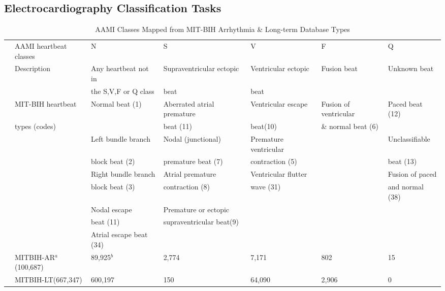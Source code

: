 \documentclass[journal]{IEEEtran}
\begin{document}
\subsection{Electrocardiography Classification Tasks}

\begin{table}[]
\begin{center}
\begin{threeparttable}
\caption{AAMI Classes Mapped from MIT-BIH Arrhythmia \& Long-term Database Types}
\label{Table1}
\begin{tabular}{cllllll}
\hline
& AAMI heartbeat classes & N & S & V & F & Q \\
& Description  &Any heartbeat not in & Supraventricular ectopic  & Ventricular ectopic  & Fusion beat & Unknown beat \\
&                     &the S,V,F or Q class & beat   		     & beat	      &	     &          \\
\hline
& MIT-BIH heartbeat  &Normal beat (1)            & Aberrated atrial premature & Ventricular escape & Fusion of ventricular& Paced beat (12)\\
&  types (codes)   &  					  &  beat (11)		    &  beat(10)	            & \& normal beat (6)		      &             \\

&                     &Left bundle branch   &  Nodal (junctional) &Premature ventricular& 	 &  Unclassifiable \\
&                     &block beat (2)            & premature beat (7)    &contraction (5)         &	   & beat (13)   \\

&                     & Right bundle branch & Atrial premature & Ventricular flutter &    &  Fusion of paced  \\
&                     & block beat (3) & contraction (8)     & wave (31) & 	   & and normal (38)  \\

&                     & Nodal escape  & Premature or ectopic & 	     &  &                          \\
&                     & beat (11)	  & supraventricular beat(9) &     &   &     \\

&                     & Atrial escape beat (34)   &  	  				      & 				            & 			      &                          \\
\hline
& MITBIH-AR$^a$(100,687) & 89,925$^b$   & 2,774   & 7,171   & 802    & 15        \\
& MITBIH-LT(667,347) & 600,197  &  150  & 64,090  & 	2,906   & 0       \\


\end{tabular}
\end{threeparttable}
\end{center}
\end{table}
\end{document}
